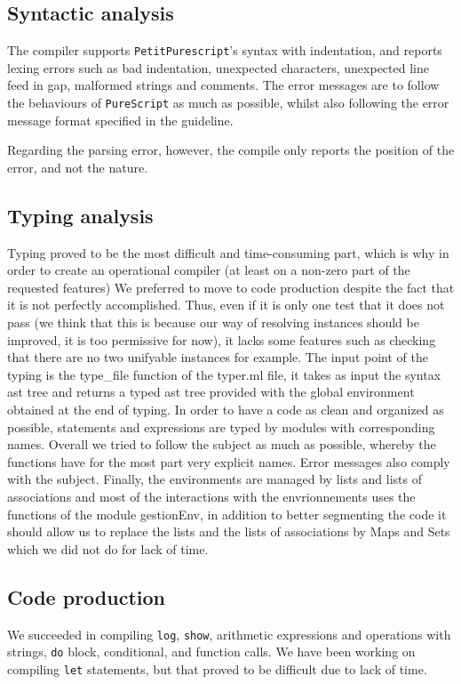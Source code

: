 \documentclass{amsart}
\begin{document}
	\subsection{Syntactic analysis}
	
	The compiler supports \texttt{PetitPurescript}'s syntax with indentation, and reports lexing errors such as bad indentation, unexpected characters, unexpected line feed in gap, malformed strings and comments. The error messages are to follow the behaviours of \texttt{PureScript} as much as possible, whilst also following the error message format specified in the guideline.
	
	Regarding the parsing error, however, the compile only reports the position of the error, and not the nature.
	
	\subsection{Typing analysis}
	Typing proved to be the most difficult and time-consuming part, which is why in order to create an operational compiler (at least on a non-zero part of the requested features) We preferred to move to code production despite the fact that it is not perfectly accomplished. Thus, even if it is only one test that it does not pass (we think that this is because our way of resolving instances should be improved, it is too permissive for now), it lacks some features such as checking that there are no two unifyable instances for example. The input point of the typing is the type\_file function of the typer.ml file, it takes as input the syntax ast tree and returns a typed ast tree provided with the global environment obtained at the end of typing. In order to have a code as clean and organized as possible, statements and expressions are typed by modules with corresponding names. Overall we tried to follow the subject as much as possible, whereby the functions have for the most part very explicit names. Error messages also comply with the subject. Finally, the environments are managed by lists and lists of associations and most of the interactions with the envrionnements uses the functions of the module gestionEnv, in addition to better segmenting the code it should allow us to replace the lists and the lists of associations by Maps and Sets which we did not do for lack of time.	
	
	\subsection{Code production}
	We succeeded in compiling \texttt{log}, \texttt{show}, arithmetic expressions and operations with strings, \texttt{do} block, conditional, and function calls. We have been working on compiling \texttt{let} statements, but that proved to be difficult due to lack of time.
	
\end{document}
